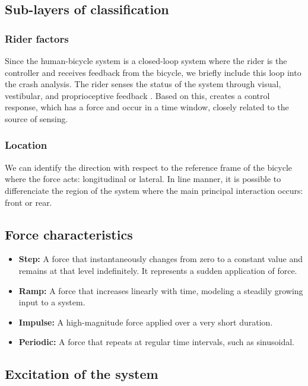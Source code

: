 \documentclass{article}
\begin{document}
\subsection{Sub-layers of classification}

\subsubsection{Rider factors}

Since the human-bicycle system is a closed-loop system where the rider is the controller and receives feedback from the bicycle, we briefly include this loop into the crash analysis.
%
The rider senses the status of the system through visual, vestibular, and proprioceptive feedback \cite{Moo12}.
%
Based on this, creates a control response, which has a force and occur in a time window, closely related to the source of sensing.

\subsubsection{Location}

We can identify the direction with respect to the reference frame of the bicycle where the force acts: longitudinal or lateral.
%
In line manner, it is possible to differenciate the region of the system where the main principal interaction occurs: front or rear.

\subsection{Force characteristics}

\begin{itemize}
    \item \textbf{Step:} A force that instantaneously changes from zero to a constant value and remains at that level indefinitely. It represents a sudden application of force.
    \item \textbf{Ramp:} A force that increases linearly with time, modeling a steadily growing input to a system.
    \item \textbf{Impulse:} A high-magnitude force applied over a very short duration.
    \item \textbf{Periodic:} A force that repeats at regular time intervals, such as sinusoidal.
\end{itemize}

\subsection{Excitation of the system}
\end{document}
